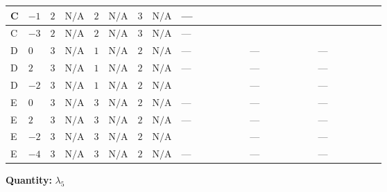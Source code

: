 \documentclass[8pt]{article}
\begin{document}
\begin{landscape}
\begin{longtable}{@{}llcccccc >{\raggedright\arraybackslash}p{0.21\linewidth} >{\raggedright\arraybackslash}p{0.21\linewidth} >{\raggedright\arraybackslash}p{0.21\linewidth}@{}}
C & $-1$ & $2$ & $\text{N/A}$ & $2$ & $\text{N/A}$ & $3$ & $\text{N/A}$ & --- & \scriptsize\adjustbox{max width=\linewidth}{$\begin{gathered} {\lambda_5} \left(6 \operatorname{Tr}\!\left({Y_d}\,\left({Y_d}\right)^{\dagger}\right)+2 \operatorname{Tr}\!\left({Y_e}\,\left({Y_e}\right)^{\dagger}\right)+6 \operatorname{Tr}\!\left({Y_u}\,\left({Y_u}\right)^{\dagger}\right)+\frac{{\lambda_{12}^{(A)}}}{6}+\frac{2 {\lambda_{HS_1}^{(A)}}}{3}+2 {\lambda_{HS_2}^{(A)}}\right)\end{gathered}$} & \scriptsize\adjustbox{max width=\linewidth}{$\begin{gathered} -9 {g_2}^2 {\lambda_5}\end{gathered}$} \\
\midrule
C & $-3$ & $2$ & $\text{N/A}$ & $2$ & $\text{N/A}$ & $3$ & $\text{N/A}$ & --- & \scriptsize\adjustbox{max width=\linewidth}{$\begin{gathered} {\lambda_5} \left(6 \operatorname{Tr}\!\left({Y_d}\,\left({Y_d}\right)^{\dagger}\right)+2 \operatorname{Tr}\!\left({Y_e}\,\left({Y_e}\right)^{\dagger}\right)+6 \operatorname{Tr}\!\left({Y_u}\,\left({Y_u}\right)^{\dagger}\right)+\frac{{\lambda_{12}^{(A)}}}{6}+\frac{2 {\lambda_{HS_1}^{(A)}}}{3}+2 {\lambda_{HS_2}^{(A)}}\right)\end{gathered}$} & \scriptsize\adjustbox{max width=\linewidth}{$\begin{gathered} -9 {g_2}^2 {\lambda_5}\end{gathered}$} \\
\midrule
D & $0$ & $3$ & $\text{N/A}$ & $1$ & $\text{N/A}$ & $2$ & $\text{N/A}$ & --- & --- & --- \\
\midrule
D & $2$ & $3$ & $\text{N/A}$ & $1$ & $\text{N/A}$ & $2$ & $\text{N/A}$ & --- & --- & --- \\
\midrule
D & $-2$ & $3$ & $\text{N/A}$ & $1$ & $\text{N/A}$ & $2$ & $\text{N/A}$ & \scriptsize\adjustbox{max width=\linewidth}{$\begin{gathered} +8 {\lambda_{X_{16}}} \left({\lambda_{X_{12}}}\right)^{*}\end{gathered}$} & --- & --- \\
\midrule
E & $0$ & $3$ & $\text{N/A}$ & $3$ & $\text{N/A}$ & $2$ & $\text{N/A}$ & --- & --- & --- \\
\midrule
E & $2$ & $3$ & $\text{N/A}$ & $3$ & $\text{N/A}$ & $2$ & $\text{N/A}$ & --- & --- & --- \\
\midrule
E & $-2$ & $3$ & $\text{N/A}$ & $3$ & $\text{N/A}$ & $2$ & $\text{N/A}$ & \scriptsize\adjustbox{max width=\linewidth}{$\begin{gathered} +8 {\lambda_{X_{16}}} \left({\lambda_{X_{12}}}\right)^{*}\end{gathered}$} & --- & --- \\
\midrule
E & $-4$ & $3$ & $\text{N/A}$ & $3$ & $\text{N/A}$ & $2$ & $\text{N/A}$ & --- & --- & --- \\
\midrule
\bottomrule
\end{longtable}
\clearpage
\noindent\textbf{Quantity: }$\lambda_5$\par\smallskip

\end{landscape}
\end{document}
